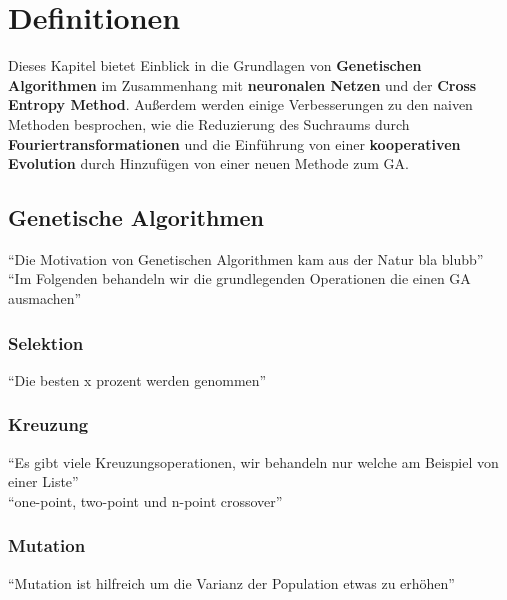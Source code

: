 \chapter{Definitionen}


Dieses Kapitel bietet Einblick in die Grundlagen von \textbf{Genetischen Algorithmen} im Zusammenhang mit \textbf{neuronalen Netzen} und der \textbf{Cross Entropy Method}. Außerdem werden einige Verbesserungen zu den naiven Methoden besprochen, wie die Reduzierung des Suchraums durch \textbf{Fouriertransformationen} und die Einführung von einer \textbf{kooperativen Evolution} durch Hinzufügen von einer neuen Methode zum GA.

    \section{Genetische Algorithmen}
        ``Die Motivation von Genetischen Algorithmen kam aus der Natur bla blubb''\\
        ``Im Folgenden behandeln wir die grundlegenden Operationen die einen GA ausmachen''
        \subsection{Selektion}
            ``Die besten x prozent werden genommen''
        \subsection{Kreuzung}
            ``Es gibt viele Kreuzungsoperationen, wir behandeln nur welche am Beispiel von einer Liste'' \\
            ``one-point, two-point und n-point crossover''
        \subsection{Mutation}
            ``Mutation ist hilfreich um die Varianz der Population etwas zu erhöhen'' \\
